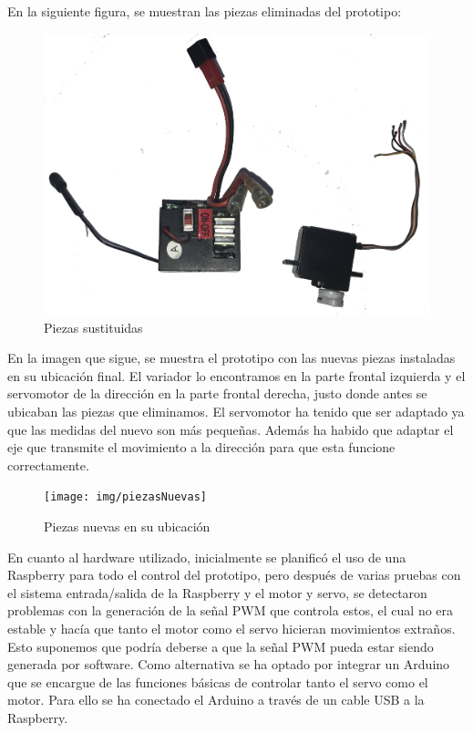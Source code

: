 \documentclass{pclass}
\begin{document}
\begin{itemize}
En la siguiente figura, se muestran las piezas eliminadas del prototipo:

\begin{figure}[H]
  \centering
    \includegraphics[width=1\textwidth]{img/piezasSustituidas}
  \caption{Piezas sustituidas}
  \label{fig:PiezasSusti}
\end{figure}

En la imagen que sigue, se muestra el prototipo con las nuevas piezas instaladas en su ubicación final. El variador lo encontramos en la parte frontal izquierda y el servomotor de la dirección en la parte frontal derecha, justo donde antes se ubicaban las piezas que eliminamos. El servomotor ha tenido que ser adaptado ya que las medidas del nuevo son más pequeñas. Además ha habido que adaptar el eje que transmite el movimiento a la dirección para que esta funcione correctamente.

\begin{figure}[H]
	\centering
	\texttt{[image: img/piezasNuevas]}
	\caption{Piezas nuevas en su ubicación}
	\label{fig:PiezasNuevas}
\end{figure}

En cuanto al hardware utilizado, inicialmente se planificó el uso de una Raspberry para todo el control del prototipo, pero después de varias pruebas con el sistema entrada/salida de la Raspberry y el motor y servo, se detectaron problemas con la generación de la señal PWM que controla estos, el cual no era estable y hacía que tanto el motor como el servo hicieran movimientos extraños. Esto suponemos que podría deberse a que la señal PWM pueda estar siendo generada por software. Como alternativa se ha optado por integrar un Arduino que se encargue de las funciones básicas de controlar tanto el servo como el motor. Para ello se ha conectado el Arduino a través de un cable USB a la Raspberry.


\end{itemize}
\end{document}
